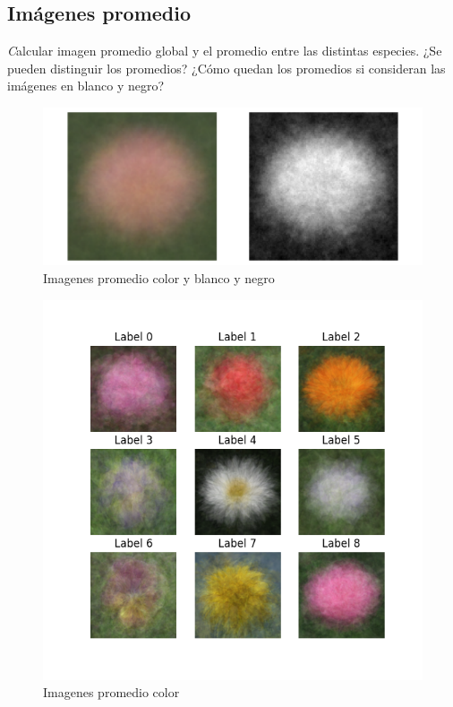 \documentclass{article}
\begin{document}
\subsection{Imágenes promedio}

{\emph Calcular imagen promedio global y el promedio entre las distintas especies. ¿Se pueden
distinguir los promedios? ¿Cómo quedan los promedios si consideran las imágenes en
blanco y negro?}

\begin{figure}[h!]
  \centering    
  \includegraphics[width=.7\textwidth]{7_1_promedio.png}
  \caption{Imagenes promedio color y blanco y negro}
\end{figure}


\begin{figure}[h!]
  \centering    
  \includegraphics[width=.6\textwidth]{7_2_promedio_especies_color.png}
  \caption{Imagenes promedio color}
\end{figure}
\end{document}
